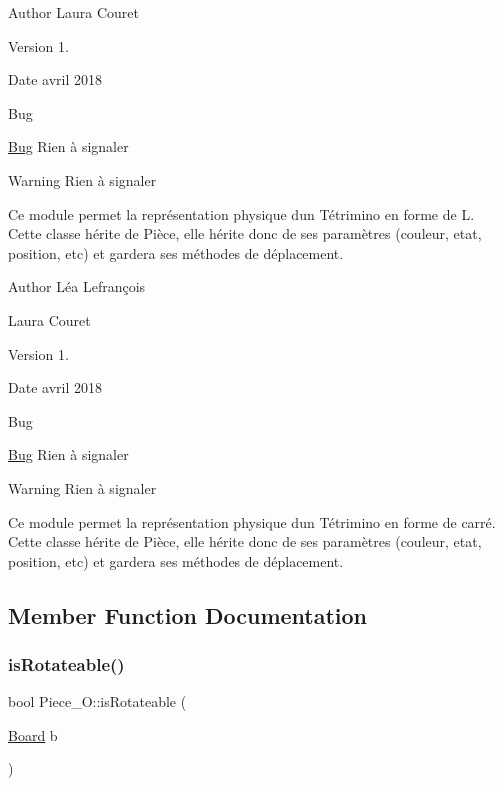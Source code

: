 \begin{DoxyAuthor}{Author}
Laura Couret 
\end{DoxyAuthor}
\begin{DoxyVersion}{Version}
1. 
\end{DoxyVersion}
\begin{DoxyDate}{Date}
avril 2018 
\end{DoxyDate}
\begin{DoxyRefDesc}{Bug}
\item[\hyperlink{bug__bug000011}{Bug}]Rien à signaler \end{DoxyRefDesc}
\begin{DoxyWarning}{Warning}
Rien à signaler
\end{DoxyWarning}
Ce module permet la représentation physique d\textquotesingle{}un Tétrimino en forme de L. Cette classe hérite de Pièce, elle hérite donc de ses paramètres (couleur, etat, position, etc) et gardera ses méthodes de déplacement.

\begin{DoxyAuthor}{Author}
Léa Lefrançois 

Laura Couret 
\end{DoxyAuthor}
\begin{DoxyVersion}{Version}
1. 
\end{DoxyVersion}
\begin{DoxyDate}{Date}
avril 2018 
\end{DoxyDate}
\begin{DoxyRefDesc}{Bug}
\item[\hyperlink{bug__bug000012}{Bug}]Rien à signaler \end{DoxyRefDesc}
\begin{DoxyWarning}{Warning}
Rien à signaler
\end{DoxyWarning}
Ce module permet la représentation physique d\textquotesingle{}un Tétrimino en forme de carré. Cette classe hérite de Pièce, elle hérite donc de ses paramètres (couleur, etat, position, etc) et gardera ses méthodes de déplacement. 

\subsection{Member Function Documentation}
\mbox{\label{classPiece__O_af82900ecec4e7bd058d43825293d8bff}} 
\subsubsection{\texorpdfstring{is\+Rotateable()}{isRotateable()}}
{\footnotesize\ttfamily bool Piece\+\_\+\+O\+::is\+Rotateable (\begin{DoxyParamCaption}\item[{\hyperlink{classBoard}{Board}}]{b }\end{DoxyParamCaption})\hspace{0.3cm}{\ttfamily [virtual]}}



